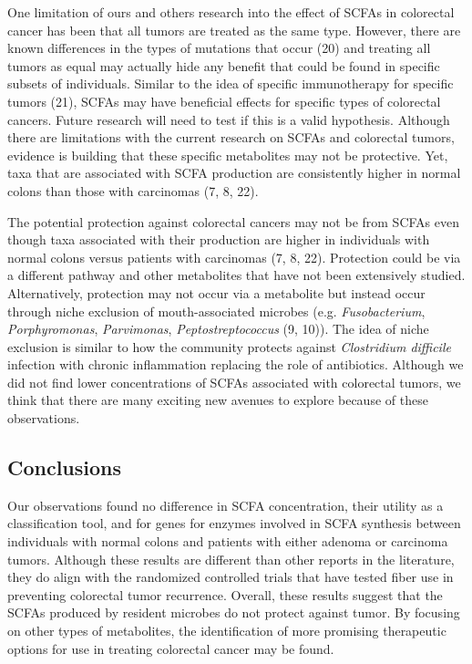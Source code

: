 \documentclass[11pt,]{article}
\begin{document}
One limitation of ours and others research into the effect of SCFAs in
colorectal cancer has been that all tumors are treated as the same type.
However, there are known differences in the types of mutations that
occur (20) and treating all tumors as equal may actually hide any
benefit that could be found in specific subsets of individuals. Similar
to the idea of specific immunotherapy for specific tumors (21), SCFAs
may have beneficial effects for specific types of colorectal cancers.
Future research will need to test if this is a valid hypothesis.
Although there are limitations with the current research on SCFAs and
colorectal tumors, evidence is building that these specific metabolites
may not be protective. Yet, taxa that are associated with SCFA
production are consistently higher in normal colons than those with
carcinomas (7, 8, 22).

The potential protection against colorectal cancers may not be from
SCFAs even though taxa associated with their production are higher in
individuals with normal colons versus patients with carcinomas (7, 8,
22). Protection could be via a different pathway and other metabolites
that have not been extensively studied. Alternatively, protection may
not occur via a metabolite but instead occur through niche exclusion of
mouth-associated microbes (e.g. \emph{Fusobacterium},
\emph{Porphyromonas}, \emph{Parvimonas}, \emph{Peptostreptococcus} (9,
10)). The idea of niche exclusion is similar to how the community
protects against \emph{Clostridium difficile} infection with chronic
inflammation replacing the role of antibiotics. Although we did not find
lower concentrations of SCFAs associated with colorectal tumors, we
think that there are many exciting new avenues to explore because of
these observations.

\newpage

\subsection{Conclusions}\label{conclusions}

Our observations found no difference in SCFA concentration, their
utility as a classification tool, and for genes for enzymes involved in
SCFA synthesis between individuals with normal colons and patients with
either adenoma or carcinoma tumors. Although these results are different
than other reports in the literature, they do align with the randomized
controlled trials that have tested fiber use in preventing colorectal
tumor recurrence. Overall, these results suggest that the SCFAs produced
by resident microbes do not protect against tumor. By focusing on other
types of metabolites, the identification of more promising therapeutic
options for use in treating colorectal cancer may be found.
\end{document}
